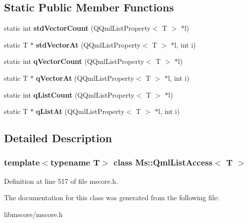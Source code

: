 \subsection*{Static Public Member Functions}
\begin{DoxyCompactItemize}
\item 
\mbox{\label{class_ms_1_1_qml_list_access_a1be15a281059f719524631a8aa10d5b7}} 
static int {\bfseries std\+Vector\+Count} (Q\+Qml\+List\+Property$<$ T $>$ $\ast$l)
\item 
\mbox{\label{class_ms_1_1_qml_list_access_a55e6b19628efa6396510039c779aa0de}} 
static T $\ast$ {\bfseries std\+Vector\+At} (Q\+Qml\+List\+Property$<$ T $>$ $\ast$l, int i)
\item 
\mbox{\label{class_ms_1_1_qml_list_access_ad0081633a99443533ee7ff79642f33e0}} 
static int {\bfseries q\+Vector\+Count} (Q\+Qml\+List\+Property$<$ T $>$ $\ast$l)
\item 
\mbox{\label{class_ms_1_1_qml_list_access_a04fd3fb70de1d7cbf9a82e8630a02bbb}} 
static T $\ast$ {\bfseries q\+Vector\+At} (Q\+Qml\+List\+Property$<$ T $>$ $\ast$l, int i)
\item 
\mbox{\label{class_ms_1_1_qml_list_access_a2fb96157ef7b054335f48818e1f8cbc7}} 
static int {\bfseries q\+List\+Count} (Q\+Qml\+List\+Property$<$ T $>$ $\ast$l)
\item 
\mbox{\label{class_ms_1_1_qml_list_access_ac7df81aa2d1f2782c6704ec0e2ae864c}} 
static T $\ast$ {\bfseries q\+List\+At} (Q\+Qml\+List\+Property$<$ T $>$ $\ast$l, int i)
\end{DoxyCompactItemize}


\subsection{Detailed Description}
\subsubsection*{template$<$typename T$>$\newline
class Ms\+::\+Qml\+List\+Access$<$ T $>$}



Definition at line 517 of file mscore.\+h.



The documentation for this class was generated from the following file\+:\begin{DoxyCompactItemize}
\item 
libmscore/mscore.\+h\end{DoxyCompactItemize}
